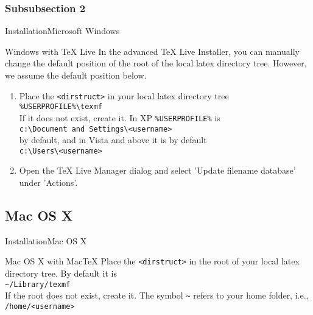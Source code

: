 \documentclass[10pt]{beamer}
\begin{document}
\subsubsection{Subsubsection 2}
\begin{frame}{Installation}{Microsoft Windows}
  \begin{block}{Windows with TeX Live}
    In the advanced TeX Live Installer, you can manually change the default position of the root of the local latex directory tree. However, we assume the default position below.
    \begin{enumerate}
      \item Place the {\tt <dirstruct>} in your local latex directory tree\\
        {\tt \%USERPROFILE\%\textbackslash texmf}\\
        If it does not exist, create it. In XP {\tt \%USERPROFILE\%} is\\
      {\tt c:\textbackslash Document and Settings\textbackslash<username>}\\
      by default, and in Vista and above it is by default\\
      {\tt c:\textbackslash Users\textbackslash<username>}
      \item Open the TeX Live Manager dialog and select 'Update filename database' under 'Actions'.
    \end{enumerate}
  \end{block}
\end{frame}

\subsection{Mac OS X}
\begin{frame}{Installation}{Mac OS X}
  \begin{block}{Mac OS X with MacTeX}
     Place the {\tt <dirstruct>} in the root of your local latex directory tree. By default it is\\
        {\tt \textasciitilde /Library/texmf}\\
        If the root does not exist, create it. The symbol {\tt \textasciitilde} refers to your home folder, i.e., {\tt /home/<username>}
  \end{block}
\end{frame}
\end{document}
